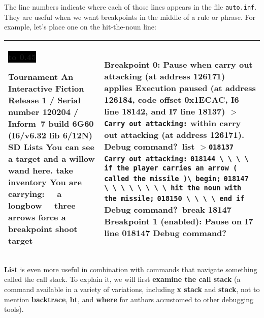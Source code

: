 \documentclass{book}
\newcommand{\n}{\hspace*{\fill}\newline}
\newcommand{\terp}[2]{\begin{center}\begin{tabular}{p{0.45\textwidth}|p{0.45\textwidth}}\midrule #1&#2\\\midrule\end{tabular}\end{center}}
\newcommand{\glkheading}[1]{\textbf{#1}}
\newcommand{\glkinput}[1]{\textbf{#1}}
\newcommand{\glkstatusline}[2]{\centerline{\colorbox{black}{\hbox to 0.45\textwidth{\textcolor{white}{#1\hfil #2}}}}}
\newcommand{\storyprompt}{\raisebox{1.5pt}{\(>\)}}
\newcommand{\cursor}{\raisebox{-1.5pt}{\RectangleThin}}
\newcommand{\markedindent}{\(>\)\qquad}
\newcommand{\unmarkedindent}{\hphantom{\(>\)}\qquad}
\begin{document}
The line numbers indicate where each of those lines appears in the file
\texttt{auto.inf}.  They are useful when we want breakpoints in the middle of a
rule or phrase.  For example, let's place one on the hit-the-noun line:

\terp{\glkstatusline{Lists}{0/2}\n
  \glkheading{Tournament}\n
  An Interactive Fiction\n
  Release 1 / Serial number 120204 / Inform~7 build 6G60 (I6/v6.32 lib 6/12N) SD\n
  \n
  \glkheading{Lists}\n
  You can see a target and a willow wand here.\n
  \n
  \storyprompt\glkinput{take inventory}\n
  You are carrying:\n
  \null\ \ a longbow\n
  \null\ \ three arrows\n
  \n
  \storyprompt\glkinput{force a breakpoint}\n
  \storyprompt\glkinput{shoot target}}{%
  \glkheading{Breakpoint 0:} Pause when carry out attacking (at address 126171) applies\n
  \n
  Execution paused (at address 126184, code offset 0x1ECAC, I6 line 18142, and I7 line 18137)\n
  \markedindent \lstinline{Carry out attacking:}\n
  within carry out attacking (at address 126171).\n
  \n
  Debug command?\ \glkinput{list}\n
  \n
  \markedindent \lstinline{018137 Carry out attacking:}\n
  \unmarkedindent \lstinline{018144 \ \ \ \ if the player carries an arrow ( called the missile )}\lstinline{\ begin;}\n
  \unmarkedindent \lstinline{018147 \ \ \ \ \ \ \ \ hit the noun with the missile;}\n
  \unmarkedindent \lstinline{018150 \ \ \ \ end if}\n
  \n
  Debug command?\ \glkinput{break 18147}\n
  \n
  Breakpoint 1 (enabled): Pause on I7 line 018147\n
  \n
  Debug command?\ \cursor}

\glkinput{List} is even more useful in combination with commands that navigate
something called the call stack.  To explain it, we will first \glkinput{examine
  the call stack} (a command available in a variety of variations, including
\glkinput{x stack} and \glkinput{stack}, not to mention \glkinput{backtrace},
\glkinput{bt}, and \glkinput{where} for authors accustomed to other debugging
tools).
\end{document}
